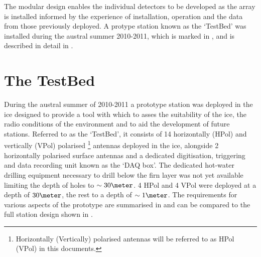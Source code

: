 The modular design enables the individual detectors to be developed as the array is installed informed by the experience of installation, operation and the data from those previously deployed. A protype station known as the `TestBed' was installed during the austral summer 2010-2011, which is marked in , and is described in detail in . 



\section{The TestBed}
\label{sec:ara-detector:TestBed}

During the austral summer of 2010-2011 a prototype station was deployed in the ice designed to provide a tool with which to asses the suitability of the ice, the radio conditions of the environment and to aid the development of future stations. Referred to as the `TestBed', it consists of 14 horizontally (HPol) and vertically (VPol) polarised \footnote{Horizontally (Vertically) polarised antennas will be referred to as HPol (VPol) in this documents.} antennas deployed in the ice, alongside 2 horizontally polarised surface antennas and a dedicated digitisation, triggering and data recording unit known as the `DAQ box'. The dedicated hot-water drilling equipment necessary to drill below the firn layer was not yet available limiting the depth of holes to $\sim 30 \meter$. 4 HPol and 4 VPol were deployed at a depth of $30 \meter$, the rest to a depth of $\sim 1 \meter$. The requirements for various aspects of the prototype are summarised in  and can be compared to the full station design shown in .


